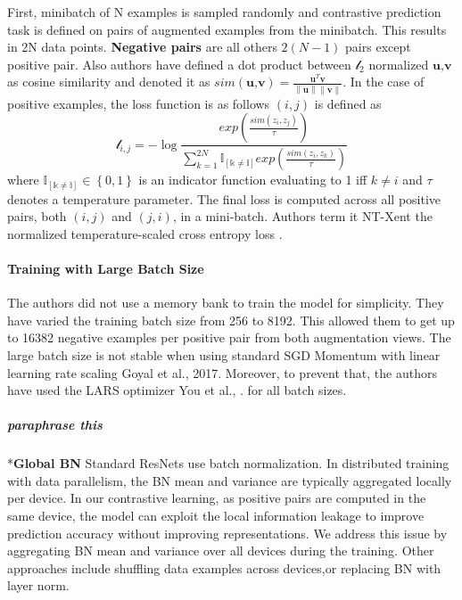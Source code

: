 \documentclass[
]{krantz}
\begin{document}
First, minibatch of N examples is sampled randomly and contrastive prediction task is defined on pairs of augmented examples from the minibatch. This results in 2N data points. \textbf{Negative pairs} are all others \(2(N-1)\) pairs except positive pair. Also authors have defined a dot product between \(\mathcal{l}_2\) normalized \(\textbf{u},\textbf{v}\) as cosine similarity and denoted it as \(sim\left(\textbf{u,v} \right)= \frac{\textbf{u}^T\textbf{v}}{\left\| \textbf{u}\right\|\left\| \textbf{v} \right\|}\). In the case of positive examples, the loss function is as follows \(\left( i, j\right)\) is defined as \[\mathcal{l}_{i,j} = −\log\frac{exp\left( \frac{sim(z_i,z_j)}{\tau} \right)}{\sum_{k=1}^{2N}\mathbb{I_{\left[ k\neq i \right]}}exp\left( \frac{sim(z_i,z_k)}{\tau} \right)}\]
where \(\mathbb{I_{\left[ k\neq i \right]}}\in\left\{ 0,1 \right\}\) is an indicator function evaluating to 1 iff \(k \neq i\) and \(\tau\) denotes a temperature parameter. The final loss is computed across all positive pairs, both \(\left( i,j \right)\) and \(\left( j,i \right)\), in a mini-batch. Authors term it NT-Xent the normalized temperature-scaled cross entropy loss .

\hypertarget{training-with-large-batch-size}{%
\paragraph{Training with Large Batch Size}\label{training-with-large-batch-size}}

The authors did not use a memory bank to train the model for simplicity. They have varied the training batch size from 256 to 8192. This allowed them to get up to 16382 negative examples per positive pair from both augmentation views. The large batch size is not stable when using standard SGD Momentum with linear learning rate scaling Goyal et al., 2017. Moreover, to prevent that, the authors have used the LARS optimizer You et al., . for all batch sizes.

\hypertarget{paraphrase-this}{%
\subparagraph{paraphrase this}\label{paraphrase-this}}

*\textbf{Global BN} Standard ResNets use batch normalization. In distributed training with data parallelism, the BN mean and variance are typically aggregated locally per device. In our contrastive learning, as positive pairs are computed in the same device, the model can exploit the local information leakage to improve prediction accuracy without improving representations. We address this issue by aggregating BN mean and variance over all devices during the training. Other approaches include shuffling data examples across devices,or replacing BN with layer norm.
\end{document}
